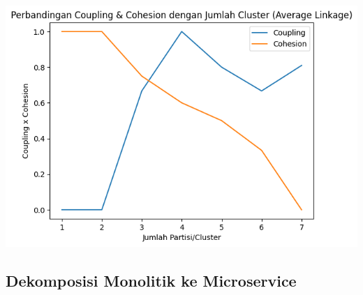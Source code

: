 \begin{center}
	\includegraphics[width=14cm]{img/bab_3/cohVScoup.png}
	\label{fig:asd}
\end{center}


\subsection{Dekomposisi Monolitik ke Microservice}
